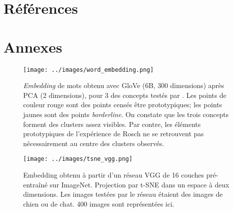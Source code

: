 \documentclass[french]{article}
\begin{document}
\newpage
\nocite{*}
\newpage
{}
\section*{Références}
\printbibliography[heading=main, keyword=main]
\printbibliography[heading=minor, keyword=minor]				
\newpage
\section*{Annexes}
	\begin{figure}[H]
		\centering
		\texttt{[image: ../images/word\_embedding.png]}
		\caption{\textit{Embedding} de mots obtenu avec GloVe (6B, 300 dimensions) après PCA (2 dimensions), pour 3 des concepts testés par \cite{rosch1975}. Les points de couleur rouge sont des points censés être prototypiques; les points jaunes sont des points \textit{borderline}. On constate que les trois concepts forment des clusters assez visibles. Par contre, les éléments prototypiques de l'expérience de Rosch ne se retrouvent pas nécessairement au centre des clusters observés.}
		\label{fig:embedding_rosch}
	\end{figure}
	\begin{figure}[H]
		\centering
		\texttt{[image: ../images/tsne\_vgg.png]}
		\caption{Embedding obtenu à partir d'un réseau VGG de 16 couches pré-entraîné sur ImageNet. Projection par t-SNE dans un espace à deux dimensions. Les images testées par le réseau étaient des images de chien ou de chat. 400 images sont représentées ici.}
		\label{fig:embedding_cat_dog}
	\end{figure}
\end{document}
